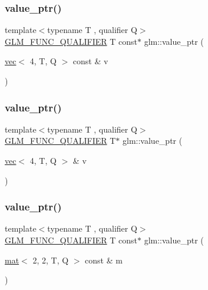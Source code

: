\subsubsection{\texorpdfstring{value\+\_\+ptr()}{value\_ptr()}\hspace{0.1cm}{\footnotesize\ttfamily [5/27]}}
{\footnotesize\ttfamily template$<$typename T , qualifier Q$>$ \\
\hyperlink{setup_8hpp_a33fdea6f91c5f834105f7415e2a64407}{G\+L\+M\+\_\+\+F\+U\+N\+C\+\_\+\+Q\+U\+A\+L\+I\+F\+I\+ER} T const$\ast$ glm\+::value\+\_\+ptr (\begin{DoxyParamCaption}\item[{\hyperlink{structglm_1_1vec}{vec}$<$ 4, T, Q $>$ const \&}]{v }\end{DoxyParamCaption})}

\mbox{\label{group__gtc__type__ptr_gae0ad6ab684abf10a87cadb95a9137fa2}} 
\subsubsection{\texorpdfstring{value\+\_\+ptr()}{value\_ptr()}\hspace{0.1cm}{\footnotesize\ttfamily [6/27]}}
{\footnotesize\ttfamily template$<$typename T , qualifier Q$>$ \\
\hyperlink{setup_8hpp_a33fdea6f91c5f834105f7415e2a64407}{G\+L\+M\+\_\+\+F\+U\+N\+C\+\_\+\+Q\+U\+A\+L\+I\+F\+I\+ER} T$\ast$ glm\+::value\+\_\+ptr (\begin{DoxyParamCaption}\item[{\hyperlink{structglm_1_1vec}{vec}$<$ 4, T, Q $>$ \&}]{v }\end{DoxyParamCaption})}

\mbox{\label{group__gtc__type__ptr_ga6144a4839923074f038b63506b855faf}} 
\subsubsection{\texorpdfstring{value\+\_\+ptr()}{value\_ptr()}\hspace{0.1cm}{\footnotesize\ttfamily [7/27]}}
{\footnotesize\ttfamily template$<$typename T , qualifier Q$>$ \\
\hyperlink{setup_8hpp_a33fdea6f91c5f834105f7415e2a64407}{G\+L\+M\+\_\+\+F\+U\+N\+C\+\_\+\+Q\+U\+A\+L\+I\+F\+I\+ER} T const$\ast$ glm\+::value\+\_\+ptr (\begin{DoxyParamCaption}\item[{\hyperlink{structglm_1_1mat}{mat}$<$ 2, 2, T, Q $>$ const \&}]{m }\end{DoxyParamCaption})}


